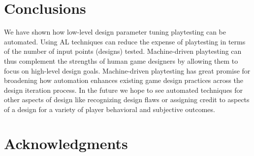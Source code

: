 \documentclass{sig-alternate}
\begin{document}

\section{Conclusions}




We have shown how low-level design parameter tuning playtesting can be automated.
Using AL techniques can reduce the expense of playtesting in terms of the number of input points (designs) tested.
Machine-driven playtesting can thus complement the strengths of human game designers by allowing them to focus on high-level design goals.
Machine-driven playtesting has great promise for broadening how automation enhances existing game design practices across the design iteration process.
In the future we hope to see automated techniques for other aspects of design like recognizing design flaws or assigning credit to aspects of a design for a variety of player behavioral and subjective outcomes.




\section{Acknowledgments}



\end{document}
